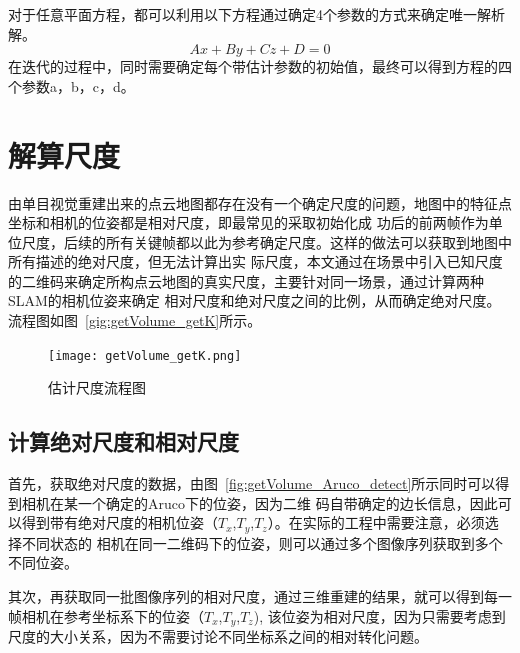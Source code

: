 对于任意平面方程，都可以利用以下方程通过确定4个参数的方式来确定唯一解析解。
\begin{equation}Ax+By+Cz+D= 0\label{equ:plane}\end{equation}
在迭代的过程中，同时需要确定每个带估计参数的初始值，最终可以得到方程的四个参数a，b，c，d。

\section{解算尺度}
\label{sec:4.3}
由单目视觉重建出来的点云地图都存在没有一个确定尺度的问题，地图中的特征点坐标和相机的位姿都是相对尺度，即最常见的采取初始化成
功后的前两帧作为单位尺度，后续的所有关键帧都以此为参考确定尺度。这样的做法可以获取到地图中所有描述的绝对尺度，但无法计算出实
际尺度，本文通过在场景中引入已知尺度的二维码来确定所构点云地图的真实尺度，主要针对同一场景，通过计算两种SLAM的相机位姿来确定
相对尺度和绝对尺度之间的比例，从而确定绝对尺度。
流程图如图~\ref{gig:getVolume_getK}所示。
\begin{figure}[H] %
  \centering
  \texttt{[image: getVolume\_getK.png]}
  \caption{估计尺度流程图}
  \label{fig:getVolume_getK}
\end{figure}
\subsection{计算绝对尺度和相对尺度}
首先，获取绝对尺度的数据，由图~\ref{fig:getVolume_Aruco_detect}所示同时可以得到相机在某一个确定的Aruco下的位姿，因为二维
码自带确定的边长信息，因此可以得到带有绝对尺度的相机位姿（$T_x$,$T_y$,$T_z$）。在实际的工程中需要注意，必须选择不同状态的
相机在同一二维码下的位姿，则可以通过多个图像序列获取到多个不同位姿。

其次，再获取同一批图像序列的相对尺度，通过三维重建的结果，就可以得到每一帧相机在参考坐标系下的位姿（$T_x$,$T_y$,$T_z$),
该位姿为相对尺度，因为只需要考虑到尺度的大小关系，因为不需要讨论不同坐标系之间的相对转化问题。
